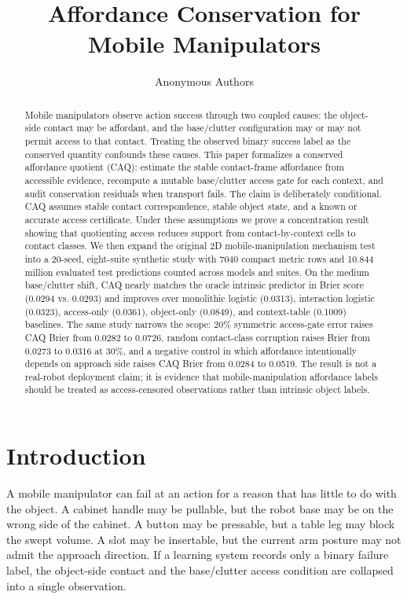\documentclass{article}
\title{Affordance Conservation for Mobile Manipulators}
\author{Anonymous Authors}
\begin{document}
\maketitle

\begin{abstract}
Mobile manipulators observe action success through two coupled causes: the object-side contact may be affordant, and the base/clutter configuration may or may not permit access to that contact. Treating the observed binary success label as the conserved quantity confounds these causes. This paper formalizes a conserved affordance quotient (CAQ): estimate the stable contact-frame affordance from accessible evidence, recompute a mutable base/clutter access gate for each context, and audit conservation residuals when transport fails. The claim is deliberately conditional. CAQ assumes stable contact correspondence, stable object state, and a known or accurate access certificate. Under these assumptions we prove a concentration result showing that quotienting access reduces support from contact-by-context cells to contact classes. We then expand the original 2D mobile-manipulation mechanism test into a 20-seed, eight-suite synthetic study with 7040 compact metric rows and 10.844 million evaluated test predictions counted across models and suites. On the medium base/clutter shift, CAQ nearly matches the oracle intrinsic predictor in Brier score (0.0294 vs. 0.0293) and improves over monolithic logistic (0.0313), interaction logistic (0.0323), access-only (0.0361), object-only (0.0849), and context-table (0.1009) baselines. The same study narrows the scope: 20\% symmetric access-gate error raises CAQ Brier from 0.0282 to 0.0726, random contact-class corruption raises Brier from 0.0273 to 0.0316 at 30\%, and a negative control in which affordance intentionally depends on approach side raises CAQ Brier from 0.0284 to 0.0519. The result is not a real-robot deployment claim; it is evidence that mobile-manipulation affordance labels should be treated as access-censored observations rather than intrinsic object labels.
\end{abstract}

\section{Introduction}

A mobile manipulator can fail at an action for a reason that has little to do with the object. A cabinet handle may be pullable, but the robot base may be on the wrong side of the cabinet. A button may be pressable, but a table leg may block the swept volume. A slot may be insertable, but the current arm posture may not admit the approach direction. If a learning system records only a binary failure label, the object-side contact and the base/clutter access condition are collapsed into a single observation.
\end{document}
